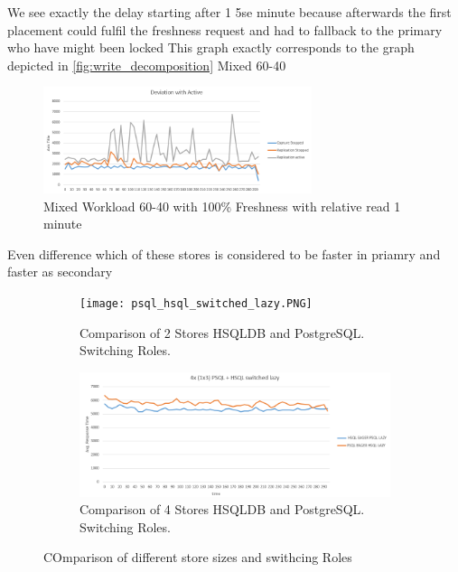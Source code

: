 We see exactly the delay starting after 1 5se minute because afterwards the first placement could fulfil the freshness request and had to fallback to the primary who have might been locked
This graph exactly corresponds to the graph depicted in \ref{fig:write_decomposition} 
Mixed 60-40
\begin{figure}[t] 
    \centering 
    \includegraphics[width=0.7\textwidth]{Figures/deviation_with_active_que.PNG}
    \caption{Mixed Workload 60-40 with 100\% Freshness with relative read 1 minute }
    \label{fig:replication Impact}
\end{figure}



Even difference which of these stores is considered to be faster in priamry and faster as secondary

\begin{figure}
    \centering
    \begin{subfigure}{.5\textwidth}
      \centering
      \texttt{[image: psql\_hsql\_switched\_lazy.PNG]}
      \caption{Comparison of 2 Stores HSQLDB and PostgreSQL. Switching Roles.}
      \label{fig:2store}
    \end{subfigure}%
    \begin{subfigure}{.5\textwidth}
      \centering
      \includegraphics[width=.9\linewidth]{Figures/4psql_hsql_switched_lazy.PNG}
      \caption{Comparison of 4 Stores HSQLDB and PostgreSQL. Switching Roles.}
      \label{fig:4store}
    \end{subfigure}
    \caption{COmparison of different store sizes and swithcing Roles}
    \label{fig:24storecomp}
\end{figure}


